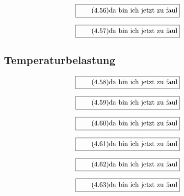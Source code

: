\documentclass[11pt]{article}
\newcommand{\1}{ {\mathds{1}} }
\begin{document}
		\begin{equation}
			\boxed{
				\tag{4.56}
				\begin{split}
					\text{da bin ich jetzt zu faul}
				\end{split}
			}
		\end{equation}

		\begin{equation}
			\boxed{
				\tag{4.57}
				\begin{split}
					\text{da bin ich jetzt zu faul}
				\end{split}
			}
		\end{equation}
		\subsection{Temperaturbelastung}

		\begin{equation}
			\boxed{
				\tag{4.58}
				\begin{split}
					\text{da bin ich jetzt zu faul}
				\end{split}
			}
		\end{equation}
		
		\begin{equation}
			\boxed{
				\tag{4.59}
				\begin{split}
					\text{da bin ich jetzt zu faul}
				\end{split}
			}
		\end{equation}

		\begin{equation}
			\boxed{
				\tag{4.60}
				\begin{split}
					\text{da bin ich jetzt zu faul}
				\end{split}
			}
		\end{equation}

		\begin{equation}
			\boxed{
				\tag{4.61}
				\begin{split}
					\text{da bin ich jetzt zu faul}
				\end{split}
			}
		\end{equation}

		\begin{equation}
			\boxed{
				\tag{4.62}
				\begin{split}
					\text{da bin ich jetzt zu faul}
				\end{split}
			}
		\end{equation}
		
		\begin{equation}
			\boxed{
				\tag{4.63}
				\begin{split}
					\text{da bin ich jetzt zu faul}
				\end{split}
			}
		\end{equation}
\end{document}
